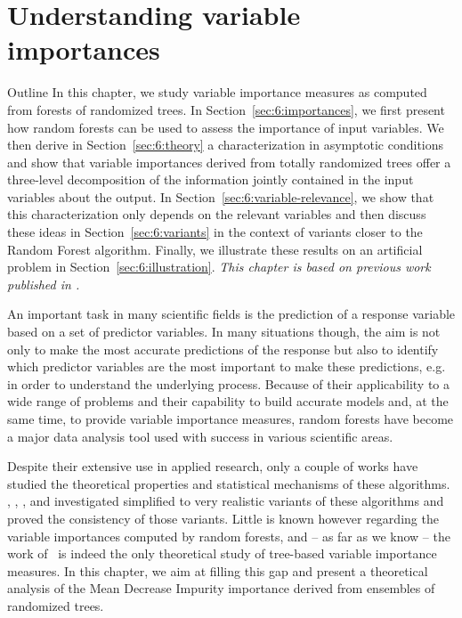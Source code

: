 \chapter{Understanding variable importances}\label{ch:importances}

\begin{remark}{Outline}
In this chapter, we study variable importance measures as computed from forests of
randomized trees. In Section~\ref{sec:6:importances}, we first present how
random forests can be used to assess the importance of input variables.  We
then derive in Section~\ref{sec:6:theory} a characterization in asymptotic
conditions and show that variable importances derived from totally randomized trees
offer a three-level decomposition of the information jointly  contained in the
input variables about the output. In Section~\ref{sec:6:variable-relevance}, we
show that this  characterization only depends on the relevant variables and
then discuss these ideas in Section~\ref{sec:6:variants} in the context of
variants closer to the Random Forest algorithm. Finally, we illustrate these
results on an artificial problem in Section~\ref{sec:6:illustration}.
\textit{This chapter is based on previous work published in \citep{louppe:2013}.}
\end{remark}

An important task in many scientific fields is the prediction of  a response
variable based on a set of predictor variables. In many situations though, the
aim is not only to make the most accurate predictions of the response but also
to identify which predictor variables are the most important to make these
predictions, e.g. in order to understand the underlying process. Because of
their applicability to a wide range of problems and their capability to
build accurate models and, at the same time, to provide variable importance
measures, random forests have become a major data analysis tool used with
success in various scientific areas.

Despite their extensive use in applied research, only a couple of works have
studied the theoretical properties and statistical mechanisms of these
algorithms. \citet{zhao:2000}, \citet{breiman:2004},
\citet{biau:2008,biau:2012}, \citet{meinshausen:2006} and \citet{lin:2006}
investigated simplified to very realistic variants of these algorithms and
proved  the consistency of those variants. Little is known however regarding
the variable importances computed by random forests, and -- as far as we know
-- the work of~\citet{ishwaran:2007} is indeed the only theoretical study of
tree-based variable importance measures. In this chapter, we aim at filling
this gap and present a theoretical  analysis of the Mean Decrease Impurity
importance derived from ensembles of randomized trees.

